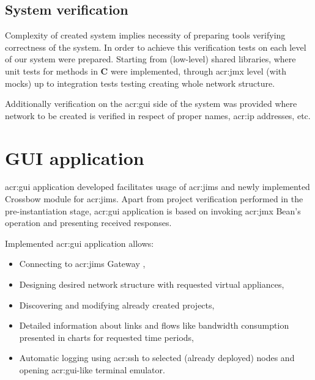 \documentclass[11pt,openany]{book}
\begin{document}
      \subsection{System verification}
      \label{sec:impl:verif}
		
        Complexity of created system implies necessity of preparing tools verifying correctness of the system. In order
        to achieve this verification tests on each level of our system were prepared. Starting from (low-level) shared
        libraries, where unit tests for methods in \textbf{C} were implemented, through \gls{acr:jmx} level (with mocks)
        up to integration tests testing creating whole network structure. 
      
        Additionally verification on the \gls{acr:gui} side of the system was provided where network to be created is
        verified in respect of proper names, \gls{acr:ip} addresses, etc. 


      \section{GUI application}
      \label{sec:impl:gui}
		
        \gls{acr:gui} application developed facilitates usage of \gls{acr:jims} and newly implemented Crossbow module for
        \gls{acr:jims}. Apart from project verification performed in the pre-instantiation stage, \gls{acr:gui}
        application is based on invoking \gls{acr:jmx} Bean's operation and presenting received responses.

        Implemented \gls{acr:gui} application allows:

        \begin{itemize}
          \item Connecting to \gls{acr:jims} Gateway ,
          \item Designing desired network structure with requested virtual appliances,
          \item Discovering and modifying already created projects,
          \item Detailed information about links and flows like bandwidth consumption presented in charts for requested
                time periods,
          \item Automatic logging using \gls{acr:ssh} to selected (already deployed) nodes and opening
                \gls{acr:gui}-like terminal emulator.
        \end{itemize}		
\end{document}
